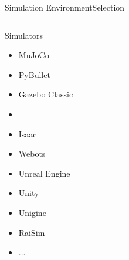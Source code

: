 \begin{frame}{Simulation Environment}{Selection}
    \begin{columns}%
        \begin{column}{0.35\textwidth}%
            \begin{block}{Simulators}
                \begin{itemize}
                    \item MuJoCo
                    \item PyBullet
                    \item Gazebo Classic
                    \item {}
                    \item Isaac
                    \item Webots
                    \item Unreal Engine
                    \item Unity
                    \item Unigine
                    \item RaiSim
                    \item ...
                \end{itemize}
            \end{block}
        \end{column}
        \begin{column}{0.65\textwidth}%
            \centering
        \end{column}
    \end{columns}
\end{frame}

